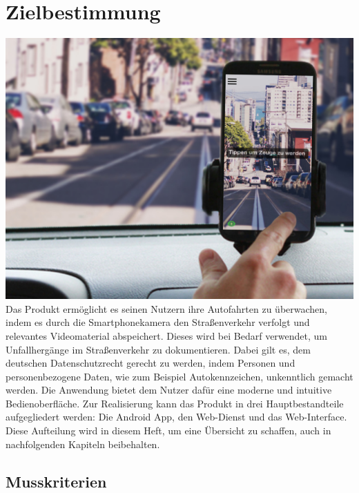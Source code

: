 \chapter{Zielbestimmung}

\includegraphics[width=\textwidth]{subtopicsFuncspec/Res//Mockups/Portrait_camera_view_car.jpg}\\[0.5cm]

Das Produkt ermöglicht es seinen Nutzern ihre Autofahrten zu überwachen, indem es durch die \gls{Smartphone}kamera den Straßenverkehr verfolgt und relevantes Videomaterial  abspeichert. Dieses wird bei Bedarf verwendet, um Unfallhergänge im Straßenverkehr zu dokumentieren. Dabei gilt es, dem deutschen Datenschutzrecht gerecht zu werden, indem Personen und personenbezogene Daten, wie zum Beispiel Autokennzeichen, unkenntlich gemacht werden. Die Anwendung bietet dem Nutzer dafür eine moderne und intuitive Bedienoberfläche.\newline
Zur Realisierung kann das Produkt in drei Hauptbestandteile aufgegliedert werden: Die \gls{Android} \gls{App}, den \gls{Web-Dienst} und das \gls{Web-Interface}. Diese Aufteilung wird in diesem Heft, um eine Übersicht zu schaffen, auch in nachfolgenden Kapiteln beibehalten.

\section{Musskriterien}
